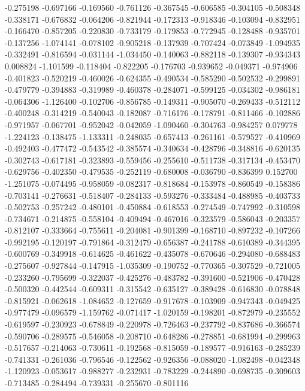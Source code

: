 -0.275198
-0.697166
-0.169560
-0.761126
-0.367545
-0.606585
-0.304105
-0.508348
-0.338171
-0.676832
-0.064206
-0.821944
-0.172313
-0.918346
-0.103094
-0.832951
-0.166470
-0.857205
-0.220830
-0.733179
-0.179853
-0.772945
-0.128488
-0.935701
-0.137256
-1.074141
-0.078102
-0.905218
-0.137939
-0.707424
-0.073849
-1.094935
-0.332491
-0.816594
-0.031144
-1.034450
-0.140063
-0.882118
-0.139307
-0.934343
0.008824
-1.101599
-0.118404
-0.822205
-0.176703
-0.939652
-0.049371
-0.974906
-0.401823
-0.520219
-0.460026
-0.624355
-0.490534
-0.585290
-0.502532
-0.299891
-0.479779
-0.394883
-0.319989
-0.460378
-0.284071
-0.599125
-0.034302
-0.986181
-0.064306
-1.126400
-0.102706
-0.856785
-0.149311
-0.905070
-0.269433
-0.512112
-0.400248
-0.314219
-0.540043
-0.182087
-0.716176
-0.178791
-0.811466
-0.102886
-0.971957
-0.067701
-0.952042
-0.042059
-1.090460
-0.304763
-0.984257
0.079778
-1.224123
-0.138475
-1.133311
-0.248035
-0.657413
-0.261161
-0.579527
-0.410969
-0.492403
-0.477472
-0.543542
-0.385574
-0.340634
-0.428796
-0.348816
-0.620135
-0.302743
-0.617181
-0.323893
-0.559456
-0.255610
-0.511738
-0.317134
-0.453470
-0.629756
-0.402350
-0.479535
-0.252119
-0.680008
-0.036790
-0.836399
0.152700
-1.251075
-0.074495
-0.958059
-0.082317
-0.818684
-0.153978
-0.860549
-0.158386
-0.703141
-0.276631
-0.518407
-0.284133
-0.593276
-0.333484
-0.488985
-0.403733
-0.502753
-0.257242
-0.480101
-0.450884
-0.618553
-0.274549
-0.747992
-0.310598
-0.734671
-0.214875
-0.558104
-0.409494
-0.467016
-0.323579
-0.586043
-0.203357
-0.812107
-0.333664
-0.755611
-0.204081
-0.901399
-0.168710
-0.897232
-0.107266
-0.992195
-0.120197
-0.791864
-0.312479
-0.656387
-0.241788
-0.610389
-0.344395
-0.600769
-0.349918
-0.614625
-0.461622
-0.435078
-0.670646
-0.294080
-0.688483
-0.275607
-0.927844
-0.147915
-1.035309
-0.190752
-0.770365
-0.307529
-0.721005
-0.233260
-0.795699
-0.322037
-0.425276
-0.483782
-0.391600
-0.521906
-0.470428
-0.500320
-0.442544
-0.609311
-0.315542
-0.635127
-0.389428
-0.616830
-0.078848
-0.815921
-0.062618
-1.084652
-0.127659
-0.917678
-0.103909
-0.947343
-0.049425
-0.977479
-0.096579
-1.159762
-0.071417
-1.020159
-0.198201
-0.872979
-0.235552
-0.619597
-0.230923
-0.678849
-0.220978
-0.726463
-0.237792
-0.837686
-0.366574
-0.590706
-0.289575
-0.546058
-0.208710
-0.648286
-0.278851
-0.681994
-0.299963
-0.517657
-0.214063
-0.730611
-0.192568
-0.815059
-0.189577
-0.916163
-0.285239
-0.741331
-0.261036
-0.796546
-0.122562
-0.926356
-0.088020
-1.082498
-0.042348
-1.120923
-0.053617
-0.988277
-0.232931
-0.783229
-0.244890
-0.698735
-0.309603
-0.713485
-0.284494
-0.739331
-0.255670
-0.801116
